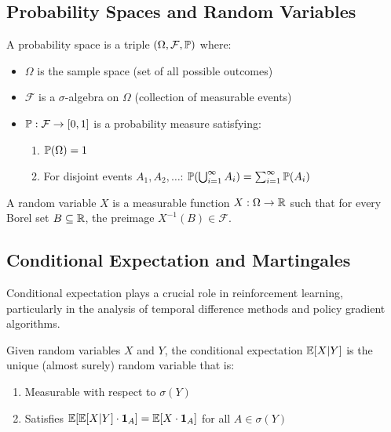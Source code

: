 \subsection{Probability Spaces and Random Variables}

\begin{definition}
A probability space is a triple $(\Omega, \mathcal{F}, \mathbb{P})$ where:
\begin{itemize}
    \item $\Omega$ is the sample space (set of all possible outcomes)
    \item $\mathcal{F}$ is a $\sigma$-algebra on $\Omega$ (collection of measurable events)
    \item $\mathbb{P}: \mathcal{F} \to [0,1]$ is a probability measure satisfying:
    \begin{enumerate}
        \item $\mathbb{P}(\Omega) = 1$
        \item For disjoint events $A_1, A_2, \ldots$: $\mathbb{P}(\bigcup_{i=1}^\infty A_i) = \sum_{i=1}^\infty \mathbb{P}(A_i)$
    \end{enumerate}
\end{itemize}
\end{definition}

\begin{definition}
A random variable $X$ is a measurable function $X: \Omega \to \mathbb{R}$ such that for every Borel set $B \subseteq \mathbb{R}$, the preimage $X^{-1}(B) \in \mathcal{F}$.
\end{definition}

\subsection{Conditional Expectation and Martingales}

Conditional expectation plays a crucial role in reinforcement learning, particularly in the analysis of temporal difference methods and policy gradient algorithms.

\begin{definition}
Given random variables $X$ and $Y$, the conditional expectation $\mathbb{E}[X|Y]$ is the unique (almost surely) random variable that is:
\begin{enumerate}
    \item Measurable with respect to $\sigma(Y)$
    \item Satisfies $\mathbb{E}[\mathbb{E}[X|Y] \cdot \mathbf{1}_A] = \mathbb{E}[X \cdot \mathbf{1}_A]$ for all $A \in \sigma(Y)$
\end{enumerate}
\end{definition}

